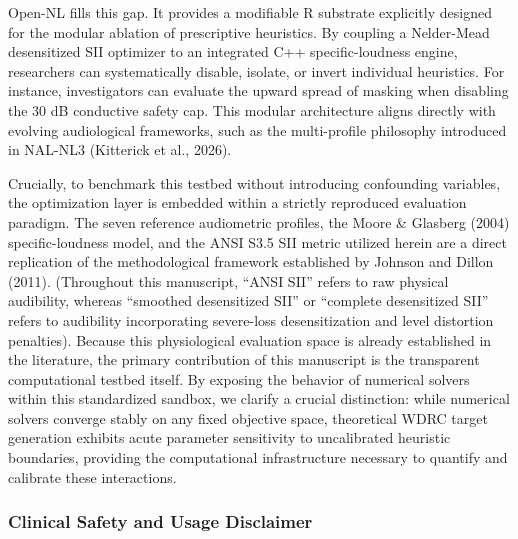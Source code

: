 \documentclass[
  12pt,
]{article}
\begin{document}
Open-NL fills this gap. It provides a modifiable R substrate explicitly
designed for the modular ablation of prescriptive heuristics. By
coupling a Nelder-Mead desensitized SII optimizer to an integrated C++
specific-loudness engine, researchers can systematically disable,
isolate, or invert individual heuristics. For instance, investigators
can evaluate the upward spread of masking when disabling the 30 dB
conductive safety cap. This modular architecture aligns directly with
evolving audiological frameworks, such as the multi-profile philosophy
introduced in NAL-NL3 (Kitterick et al., 2026).

Crucially, to benchmark this testbed without introducing confounding
variables, the optimization layer is embedded within a strictly
reproduced evaluation paradigm. The seven reference audiometric
profiles, the Moore \& Glasberg (2004) specific-loudness model, and the
ANSI S3.5 SII metric utilized herein are a direct replication of the
methodological framework established by Johnson and Dillon (2011).
(Throughout this manuscript, ``ANSI SII'' refers to raw physical
audibility, whereas ``smoothed desensitized SII'' or ``complete
desensitized SII'' refers to audibility incorporating severe-loss
desensitization and level distortion penalties). Because this
physiological evaluation space is already established in the literature,
the primary contribution of this manuscript is the transparent
computational testbed itself. By exposing the behavior of numerical
solvers within this standardized sandbox, we clarify a crucial
distinction: while numerical solvers converge stably on any fixed
objective space, theoretical WDRC target generation exhibits acute
parameter sensitivity to uncalibrated heuristic boundaries, providing
the computational infrastructure necessary to quantify and calibrate
these interactions.

\subsubsection{Clinical Safety and Usage
Disclaimer}\label{clinical-safety-and-usage-disclaimer}
\end{document}
